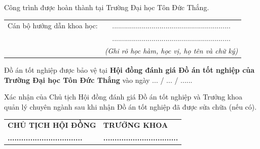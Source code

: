 \clearpage
\pagestyle{empty}
\thispagestyle{empty}
\vspace*{1cm}

{\setlength{\parindent}{0pt}
\noindent Công trình được hoàn thành tại Trường Đại học Tôn Đức Thắng.

\vspace{0.2cm}
\noindent
\begin{tabular}{@{}p{5.5cm}c@{}}
Cán bộ hướng dẫn khoa học: & ............................................................ \\
                           & ............................................................ \\
                           & \textit{(Ghi rõ học hàm, học vị, họ tên và chữ ký)}
\end{tabular}

\vspace{0.9cm}
\noindent Đồ án tốt nghiệp được bảo vệ tại \textbf{Hội đồng đánh giá Đồ án tốt nghiệp của Trường Đại học Tôn Đức Thắng} vào ngày ... / ... / ......

\vspace{0.9cm}
\noindent Xác nhận của Chủ tịch Hội đồng đánh giá Đồ án tốt nghiệp và Trưởng khoa quản lý chuyên ngành sau khi nhận Đồ án tốt nghiệp đã được sửa chữa (nếu có).

\vspace{1.2cm}
\noindent
\begin{tabular}{@{}p{}@{}p{}@{}}
\centering\textbf{CHỦ TỊCH HỘI ĐỒNG} & \centering\arraybackslash\textbf{TRƯỞNG KHOA} \\[2.4cm]
\centering\textbf{.................................} & \centering\arraybackslash\textbf{.................................}
\end{tabular}
\par}

\clearpage
